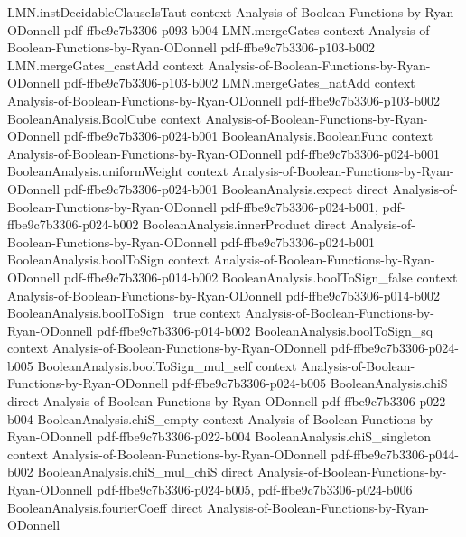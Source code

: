\begin{lemma}
  {LMN.instDecidableClauseIsTaut}
  {context}
  {Analysis-of-Boolean-Functions-by-Ryan-ODonnell}
  {pdf-ffbe9c7b3306-p093-b004}
\proofstep
  {LMN.mergeGates}
  {context}
  {Analysis-of-Boolean-Functions-by-Ryan-ODonnell}
  {pdf-ffbe9c7b3306-p103-b002}
\proofstep
  {LMN.mergeGates_castAdd}
  {context}
  {Analysis-of-Boolean-Functions-by-Ryan-ODonnell}
  {pdf-ffbe9c7b3306-p103-b002}
\proofstep
  {LMN.mergeGates_natAdd}
  {context}
  {Analysis-of-Boolean-Functions-by-Ryan-ODonnell}
  {pdf-ffbe9c7b3306-p103-b002}
\proofstep
  {BooleanAnalysis.BoolCube}
  {context}
  {Analysis-of-Boolean-Functions-by-Ryan-ODonnell}
  {pdf-ffbe9c7b3306-p024-b001}
\proofstep
  {BooleanAnalysis.BooleanFunc}
  {context}
  {Analysis-of-Boolean-Functions-by-Ryan-ODonnell}
  {pdf-ffbe9c7b3306-p024-b001}
\proofstep
  {BooleanAnalysis.uniformWeight}
  {context}
  {Analysis-of-Boolean-Functions-by-Ryan-ODonnell}
  {pdf-ffbe9c7b3306-p024-b001}
\proofstep
  {BooleanAnalysis.expect}
  {direct}
  {Analysis-of-Boolean-Functions-by-Ryan-ODonnell}
  {pdf-ffbe9c7b3306-p024-b001,
    pdf-ffbe9c7b3306-p024-b002}
\proofstep
  {BooleanAnalysis.innerProduct}
  {direct}
  {Analysis-of-Boolean-Functions-by-Ryan-ODonnell}
  {pdf-ffbe9c7b3306-p024-b001}
\proofstep
  {BooleanAnalysis.boolToSign}
  {context}
  {Analysis-of-Boolean-Functions-by-Ryan-ODonnell}
  {pdf-ffbe9c7b3306-p014-b002}
\proofstep
  {BooleanAnalysis.boolToSign_false}
  {context}
  {Analysis-of-Boolean-Functions-by-Ryan-ODonnell}
  {pdf-ffbe9c7b3306-p014-b002}
\proofstep
  {BooleanAnalysis.boolToSign_true}
  {context}
  {Analysis-of-Boolean-Functions-by-Ryan-ODonnell}
  {pdf-ffbe9c7b3306-p014-b002}
\proofstep
  {BooleanAnalysis.boolToSign_sq}
  {context}
  {Analysis-of-Boolean-Functions-by-Ryan-ODonnell}
  {pdf-ffbe9c7b3306-p024-b005}
\proofstep
  {BooleanAnalysis.boolToSign_mul_self}
  {context}
  {Analysis-of-Boolean-Functions-by-Ryan-ODonnell}
  {pdf-ffbe9c7b3306-p024-b005}
\proofstep
  {BooleanAnalysis.chiS}
  {direct}
  {Analysis-of-Boolean-Functions-by-Ryan-ODonnell}
  {pdf-ffbe9c7b3306-p022-b004}
\proofstep
  {BooleanAnalysis.chiS_empty}
  {context}
  {Analysis-of-Boolean-Functions-by-Ryan-ODonnell}
  {pdf-ffbe9c7b3306-p022-b004}
\proofstep
  {BooleanAnalysis.chiS_singleton}
  {context}
  {Analysis-of-Boolean-Functions-by-Ryan-ODonnell}
  {pdf-ffbe9c7b3306-p044-b002}
\proofstep
  {BooleanAnalysis.chiS_mul_chiS}
  {direct}
  {Analysis-of-Boolean-Functions-by-Ryan-ODonnell}
  {pdf-ffbe9c7b3306-p024-b005,
    pdf-ffbe9c7b3306-p024-b006}
\proofstep
  {BooleanAnalysis.fourierCoeff}
  {direct}
  {Analysis-of-Boolean-Functions-by-Ryan-ODonnell}

\end{lemma}
